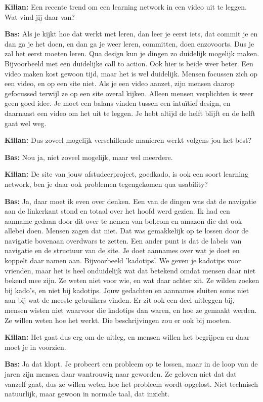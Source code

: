 \textbf{Kilian:} Een recente trend om een learning network in een video uit te leggen. Wat vind jij daar van?

\textbf{Bas:} Als je kijkt hoe dat werkt met leren, dan leer je eerst iets, dat commit je en dan ga je het doen, en dan ga je weer leren, committen, doen enzovoorts. Dus je zal het eerst moeten leren. Qua design kun je dingen zo duidelijk mogelijk maken. Bijvoorbeeld met een duidelijke call to action. Ook hier is beide weer beter. Een video maken kost gewoon tijd, maar het is wel duidelijk. Mensen focussen zich op een video, en op een site niet. Als je een video aanzet, zijn mensen daarop gefocussed terwijl ze op een site overal kijken. Alleen mensen verplichten is weer geen goed idee. Je moet een balans vinden tussen een intu\"itief design, en daarnaast een video om het uit te leggen. Je hebt altijd de helft blijft en de helft gaat wel weg.

\textbf{Kilian:} Dus zoveel mogelijk verschillende manieren werkt volgens jou het best?

\textbf{Bas:} Nou ja, niet zoveel mogelijk, maar wel meerdere.

\textbf{Kilian:} De site van jouw afstudeerproject, goedkado, is ook een soort learning network, ben je daar ook problemen tegengekomen qua usability?

\textbf{Bas:} Ja, daar moet ik even over denken. Een van de dingen was dat de navigatie aan de linkerkant stond en totaal over het hoofd werd gezien. Ik had een aanname gedaan door dit over te nemen van bol.com en amazon die dat ook allebei doen. Mensen zagen dat niet. Dat was gemakkelijk op te lossen door de navigatie bovenaan overdwars te zetten. Een ander punt is dat de labels van navigatie en de structuur van de site. Je doet aannames over wat je doet en koppelt daar namen aan. Bijvoorbeeld 'kadotips'. We geven je kadotips voor vrienden, maar het is heel onduidelijk wat dat betekend omdat mensen daar niet bekend mee zijn. Ze weten niet voor wie, en wat daar achter zit. Ze wilden zoeken bij kado's, en niet bij kadotips. Jouw gedachten en aannames sluiten soms niet aan bij wat de meeste gebruikers vinden. Er zit ook een deel uitleggen bij, mensen wisten niet waarvoor die kadotips dan waren, en hoe ze gemaakt werden. Ze willen weten hoe het werkt. Die beschrijvingen zou er ook bij moeten.

\textbf{Kilian:} Het gaat dus erg om de uitleg, en mensen willen het begrijpen en daar moet je in voorzien.

\textbf{Bas:} Ja dat klopt. Je probeert een probleem op te lossen, maar in de loop van de jaren zijn mensen daar wantrouwig naar geworden. Ze geloven niet dat dat vanzelf gaat, dus ze willen weten hoe het probleem wordt opgelost. Niet technisch natuurlijk, maar gewoon in normale taal, dat inzicht.

